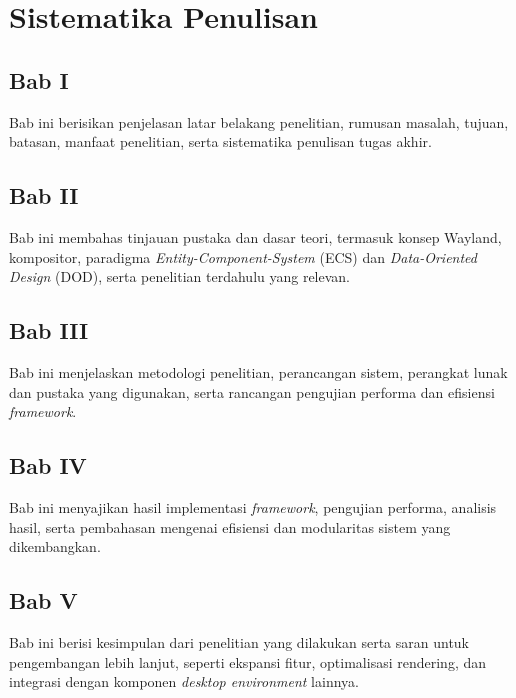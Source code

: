 \section{Sistematika Penulisan} \label{I.Sistematika}
\subsection*{Bab I}
Bab ini berisikan penjelasan latar belakang penelitian, rumusan masalah, tujuan, batasan, manfaat penelitian, serta sistematika penulisan tugas akhir. \par

\subsection*{Bab II}
Bab ini membahas tinjauan pustaka dan dasar teori, termasuk konsep Wayland, kompositor, paradigma \textit{Entity-Component-System} (ECS) dan \textit{Data-Oriented Design} (DOD), serta penelitian terdahulu yang relevan. \par

\subsection*{Bab III}
Bab ini menjelaskan metodologi penelitian, perancangan sistem, perangkat lunak dan pustaka yang digunakan, serta rancangan pengujian performa dan efisiensi \textit{framework}. \par

\subsection*{Bab IV}
Bab ini menyajikan hasil implementasi \textit{framework}, pengujian performa, analisis hasil, serta pembahasan mengenai efisiensi dan modularitas sistem yang dikembangkan. \par

\subsection*{Bab V}
Bab ini berisi kesimpulan dari penelitian yang dilakukan serta saran untuk pengembangan lebih lanjut, seperti ekspansi fitur, optimalisasi rendering, dan integrasi dengan komponen \textit{desktop environment} lainnya. \par


